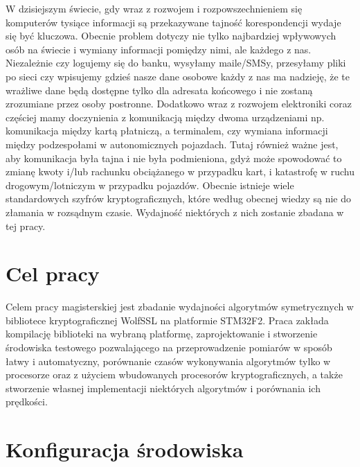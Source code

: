 \documentclass[oneside]{mgr}
\begin{document}
W dzisiejszym świecie, gdy wraz z rozwojem i rozpowszechnieniem się komputerów tysiące informacji są przekazywane tajność korespondencji wydaje się być kluczowa. Obecnie problem dotyczy nie tylko najbardziej wpływowych osób na świecie i wymiany informacji pomiędzy nimi, ale każdego z nas. Niezależnie czy logujemy się do banku, wysyłamy maile/SMSy, przesyłamy pliki po sieci czy wpisujemy gdzieś nasze dane osobowe każdy z nas ma nadzieję, że te wrażliwe dane będą dostępne tylko dla adresata końcowego i nie zostaną zrozumiane przez osoby postronne. Dodatkowo wraz z rozwojem elektroniki coraz częściej mamy doczynienia z komunikacją między dwoma urządzeniami np. komunikacja między kartą płatniczą, a terminalem, czy wymiana informacji między podzespołami w autonomicznych pojazdach. Tutaj również ważne jest, aby komunikacja była tajna i nie była podmieniona, gdyż może spowodować to zmianę kwoty i/lub rachunku obciążanego w przypadku kart, i katastrofę w ruchu drogowym/lotniczym w przypadku pojazdów. Obecnie istnieje wiele standardowych szyfrów kryptograficznych, które według obecnej wiedzy są nie do złamania w rozsądnym czasie. Wydajność niektórych z nich zostanie zbadana w tej pracy.

\chapter{Cel pracy}

Celem pracy magisterskiej jest zbadanie wydajności algorytmów symetrycznych w bibliotece kryptograficznej WolfSSL na platformie STM32F2. Praca zakłada kompilację biblioteki na wybraną platformę, zaprojektowanie i stworzenie środowiska testowego pozwalającego na  przeprowadzenie pomiarów w sposób łatwy i automatyczny, porównanie czasów wykonywania algorytmów tylko w procesorze oraz z użyciem wbudowanych procesorów kryptograficznych, a także stworzenie własnej implementacji niektórych algorytmów i porównania ich prędkości.
\chapter{Konfiguracja środowiska}
\end{document}
